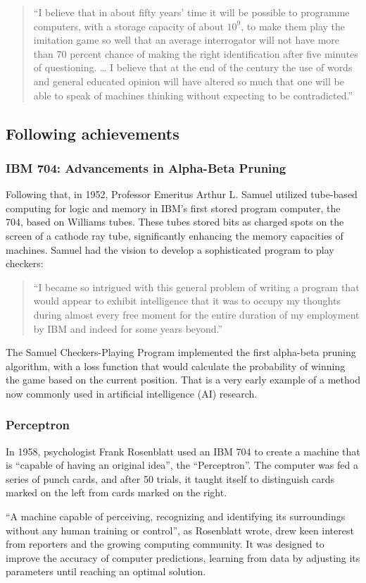 \documentclass{article}
\begin{document}
\par
\begin{quote}
“I believe that in about fifty years’ time it will be possible to programme computers, with a storage capacity of about $10^9$, to make them play the imitation game so well that an average interrogator will not have more than 70 percent chance of making the right identification after five minutes of questioning. … I believe that at the end of the century the use of words and general educated opinion will have altered so much that one will be able to speak of machines thinking without expecting to be contradicted.” \cite{turing1950computing}
\end{quote}
\par
\subsection{Following achievements}
\subsubsection{IBM 704: Advancements in Alpha-Beta Pruning}
Following that, in 1952, Professor Emeritus Arthur L. Samuel utilized tube-based computing for logic and memory in IBM’s first stored program computer, the 704, based on Williams tubes. These tubes stored bits as charged spots on the screen of a cathode ray tube, significantly enhancing the memory capacities of machines. Samuel had the vision to develop a sophisticated program to play checkers: 
\par
\begin{quote}
“I became so intrigued with this general problem of writing a program that would appear to exhibit intelligence that it was to occupy my thoughts during almost every free moment for the entire duration of my employment by IBM and indeed for some years beyond.” \cite{5392560}
\end{quote}
\par
The Samuel Checkers-Playing Program implemented the first alpha-beta pruning algorithm, with a loss function that would calculate the probability of winning the game based on the current position. That is a very early example of a method now commonly used in artificial intelligence (AI) research. 
\par
\subsubsection{Perceptron}
In 1958, psychologist Frank Rosenblatt used an IBM 704 to create a machine that is ``capable of having an original idea'', the ``Perceptron''. The computer was fed a series of punch cards, and after 50 trials, it taught itself to distinguish cards marked on the left from cards marked on the right. 
\par
“A machine capable of perceiving, recognizing and identifying its surroundings without any human training or control”, as Rosenblatt wrote, drew keen interest from reporters and the growing computing community. It was designed to improve the accuracy of computer predictions, learning from data by adjusting its parameters until reaching an optimal solution. 
\par
\end{document}
